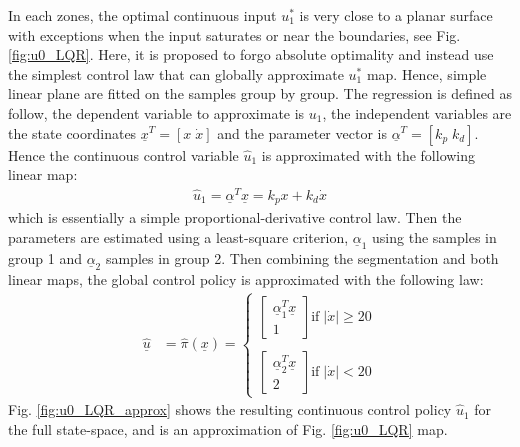 In each zones, the optimal continuous input $u_1^*$ is very close to a planar surface with exceptions when the input saturates or near the boundaries, see Fig. \ref{fig:u0_LQR}. Here, it is proposed to forgo absolute optimality and instead use the simplest control law that can globally approximate $u_1^*$ map. Hence, simple linear plane are fitted on the samples group by group. The regression is defined as follow, the dependent variable to approximate is $u_1$, the independent variables are the state coordinates $\underline{x}^T = [ x  \; \dot{x} ]$ and the parameter vector is $\underline{\alpha}^T = [ k_p  \; k_d ]$. Hence the continuous control variable $\hat{u}_1$ is approximated with the following linear map:
\begin{align}
\hat{u}_1 = \underline{\alpha}^T \underline{x} = k_p  x + k_d \dot{x}
\end{align}
which is essentially a simple proportional-derivative control law. Then the parameters are estimated using a least-square criterion, $\underline{\alpha}_1$ using the samples in group 1 and $\underline{\alpha}_2$ samples in group 2. Then combining the segmentation and both linear maps, the global control policy is approximated with the following law:
\begin{align}
\underline{ \hat{u}} &= \hat{\pi} ( \underline{x} )
 = \left \{ 
	\begin{array}{c}
	\left[
	\begin{array}{c}
		 \underline{\alpha}_1^T \underline{x} \\
		 1 
	\end{array} 
	\right] 		
	\text{if} \; | \dot{x} | \geq 20 \\ \\
		 \left[
		\begin{array}{c}
		 \underline{\alpha}_2^T \underline{x} \\ 
		 2
	\end{array}
		 \right]
		\text{if} \; | \dot{x} | < 20
	\end{array}
	\right.
	\label{eq:uhat}
\end{align}
Fig. \ref{fig:u0_LQR_approx} shows the resulting continuous control policy $\hat{u}_1$ for the full state-space, and is an approximation of Fig. \ref{fig:u0_LQR} map.


